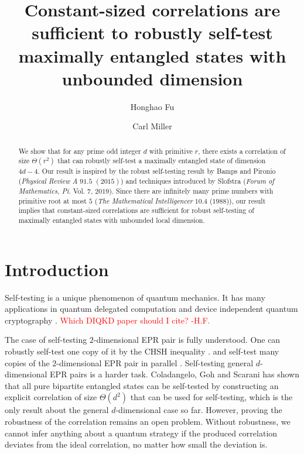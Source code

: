 \documentclass[11pt,letterpaper]{article}
\newcommand{\1}{\mathbb{1}}
\newcommand{\hfc}[1]{\textcolor{red}{#1 -H.F.}}
\theoremstyle{definition}
\begin{document}
\title{Constant-sized correlations are sufficient to 
robustly self-test maximally entangled states with unbounded dimension}

\author[1]{Honghao Fu}
\author[1,2]{Carl Miller}

\renewcommand\Affilfont{\itshape\small}



\maketitle

\begin{abstract}
	We show that for any prime odd integer $d$ with primitive $r$, there exists a correlation of size
	$\Theta(r^2)$ 
	that can robustly self-test a maximally entangled state of dimension $4d-4$. Our result is
	inspired by the robust self-testing result by Bamps and Pironio (\textit{Physical Review A} $91.5$ $(2015)$) and
	techniques introduced by Slofstra (\textit{Forum of Mathematics, Pi}. Vol. $7$, $2019$). Since there are
	infinitely many prime numbers with primitive root at most $5$ (\textit{The Mathematical Intelligencer} $10.4$ ($1988$)), 
	our result implies that constant-sized correlations are sufficient for robust self-testing of maximally entangled states
	with unbounded local dimension.
\end{abstract}
\section{Introduction}
\label{sec:intro}
Self-testing is a unique phenomenon of quantum mechanics. It has many applications in quantum
delegated computation \cite{ruv2013,coladan2017verifier} and device independent quantum cryptography
\cite{miller2017,fu2018,eat2018}.
\hfc{Which DIQKD paper should I cite?}

The case of self-testing $2$-dimensional EPR pair is fully understood. One can robustly self-test
one copy of it by the CHSH inequality \cite{bamps2015}. and self-test many copies of the $2$-dimensional EPR
pair in parallel \cite{mckague2016, coladan2016parallel, lowdegree}. 
Self-testing general $d$-dimensional EPR pairs is a harder task.
Coladangelo, Goh and Scarani has shown that all pure bipartite entangled states can be self-tested \cite{coladan2017all}
by constructing an explicit correlation of size $\Theta(d^2)$ that can be used for self-testing,
which is the only result about the general $d$-dimensional case so far.
However, proving the robustness of the correlation remains an open problem. 
Without robustness, we cannot infer anything about a quantum strategy if
the produced correlation deviates from the ideal correlation, no matter how small the 
deviation is. 
 
\end{document}
